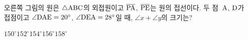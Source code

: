 \noindent\begin{minipage}[t]{0.58\linewidth}\vspace{0pt}\raggedright 오른쪽 그림의 원은 $\triangle\mathrm{ABC}$의 외접원이고 $\overline{\mathrm{PA}}$, $\overline{\mathrm{PE}}$는 원의 접선이다. 두 점~$\mathrm{A}$, $\mathrm{D}$가 접점이고 $\angle\mathrm{DAE}=20^\circ$, $\angle\mathrm{DEA}=28^\circ$일 때, $\angle x+\angle y$의 크기는?\end{minipage}\hfill\begin{minipage}[t]{0.4\linewidth}\vspace{0pt}\centering \resizebox{\ifdim\width>\linewidth\linewidth\else\width\fi}{!}{}\end{minipage}\par
\begin{choices32}{$150^\circ$}{$152^\circ$}{$154^\circ$}{$156^\circ$}{$158^\circ$}\end{choices32}
